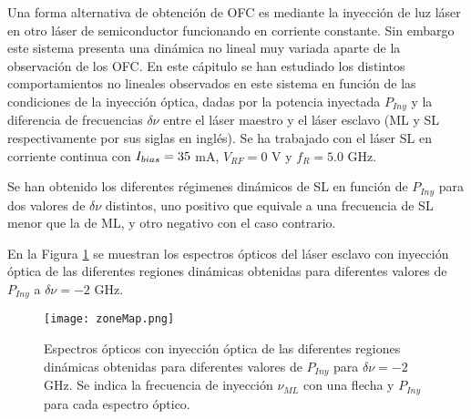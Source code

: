 \graphicspath{{../Graphics/Cpt2-InjectCW/}}

Una forma alternativa de obtención de OFC es mediante la inyección de luz láser en otro láser de semiconductor funcionando en corriente constante. Sin embargo este sistema presenta una dinámica no lineal muy variada aparte de la observación de los OFC. En este cápitulo se han estudiado los distintos comportamientos no lineales observados en este sistema en función de las condiciones de la inyección óptica, dadas por la potencia inyectada $P_{Iny}$ y la diferencia de frecuencias $\delta \nu$ entre el láser maestro y el láser esclavo (ML y SL respectivamente por sus siglas en inglés). Se ha trabajado con el láser SL en corriente continua con $I_{bias} = 35$ mA, $V_{RF} = 0$ V y $f_R = 5.0$ GHz.

Se han obtenido los diferentes régimenes dinámicos de SL en función de $P_{Iny}$ para dos valores de $\delta\nu$ distintos, uno positivo que equivale a una frecuencia de SL menor que la de ML, y otro negativo con el caso contrario.

En la Figura \ref{Img:zonasIO} se muestran los espectros ópticos del láser esclavo con inyecci\'on \'optica de las diferentes regiones dinámicas obtenidas para diferentes valores de $P_{Iny}$ a $\delta\nu = -2$ GHz. 

			\begin{figure}[H]
				\centering
				\texttt{[image: zoneMap.png]}
				\caption{\label{Img:zonasIO}Espectros ópticos con inyección \'optica de las diferentes regiones dinámicas obtenidas para diferentes valores de $P_{Iny}$ para $\delta\nu = -2$ GHz. Se indica la frecuencia de inyección $\nu_{ML}$ con una flecha y $P_{Iny}$ para cada espectro óptico.}
			\end{figure}

